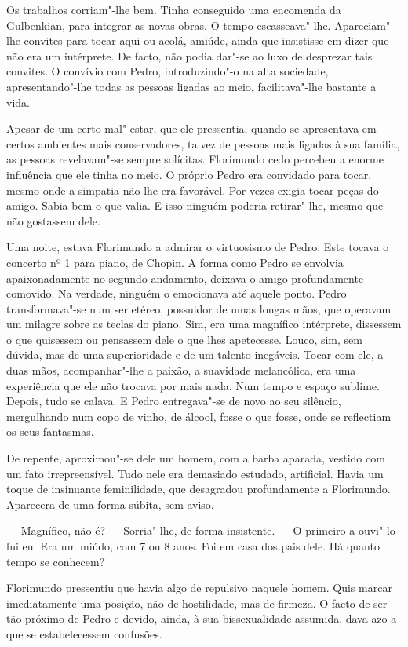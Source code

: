Os trabalhos corriam"-lhe bem. Tinha conseguido uma encomenda da
Gulbenkian, para integrar as novas obras. O tempo escasseava"-lhe.
Apareciam"-lhe convites para tocar aqui ou acolá, amiúde, ainda que
insistisse em dizer que não era um intérprete. De facto, não podia
dar"-se ao luxo de desprezar tais convites. O convívio com Pedro,
introduzindo"-o na alta sociedade, apresentando"-lhe todas as pessoas
ligadas ao meio, facilitava"-lhe bastante a vida.

Apesar de um certo mal"-estar, que ele pressentia, quando se apresentava
em certos ambientes mais conservadores, talvez de pessoas mais ligadas à
sua família, as pessoas revelavam"-se sempre solícitas. Florimundo cedo
percebeu a enorme influência que ele tinha no meio. O próprio Pedro era
convidado para tocar, mesmo onde a simpatia não lhe era favorável. Por
vezes exigia tocar peças do amigo. Sabia bem o que valia. E isso ninguém
poderia retirar"-lhe, mesmo que não gostassem dele.

Uma noite, estava Florimundo a admirar o virtuosismo de Pedro. Este
tocava o concerto nº 1 para piano, de Chopin. A forma como Pedro se
envolvia apaixonadamente no segundo andamento, deixava o amigo
profundamente comovido. Na verdade, ninguém o emocionava até aquele
ponto. Pedro transformava"-se num ser etéreo, possuidor de umas longas
mãos, que operavam um milagre sobre as teclas do piano. Sim, era uma
magnífico intérprete, dissessem o que quisessem ou pensassem dele o que
lhes apetecesse. Louco, sim, sem dúvida, mas de uma superioridade e de
um talento inegáveis. Tocar com ele, a duas mãos, acompanhar"-lhe a
paixão, a suavidade melancólica, era uma experiência que ele não trocava
por mais nada. Num tempo e espaço sublime. Depois, tudo se calava. E
Pedro entregava"-se de novo ao seu silêncio, mergulhando num copo de
vinho, de álcool, fosse o que fosse, onde se reflectiam os seus
fantasmas.

De repente, aproximou"-se dele um homem, com a barba aparada, vestido com
um fato irrepreensível. Tudo nele era demasiado estudado, artificial.
Havia um toque de insinuante feminilidade, que desagradou profundamente
a Florimundo. Aparecera de uma forma súbita, sem aviso.

--- Magnífico, não é? --- Sorria"-lhe, de forma insistente. --- O primeiro a
ouvi"-lo fui eu. Era um miúdo, com 7 ou 8 anos. Foi em casa dos pais
dele. Há quanto tempo se conhecem?

Florimundo pressentiu que havia algo de repulsivo naquele homem. Quis
marcar imediatamente uma posição, não de hostilidade, mas de firmeza. O
facto de ser tão próximo de Pedro e devido, ainda, à sua bissexualidade
assumida, dava azo a que se estabelecessem confusões.

